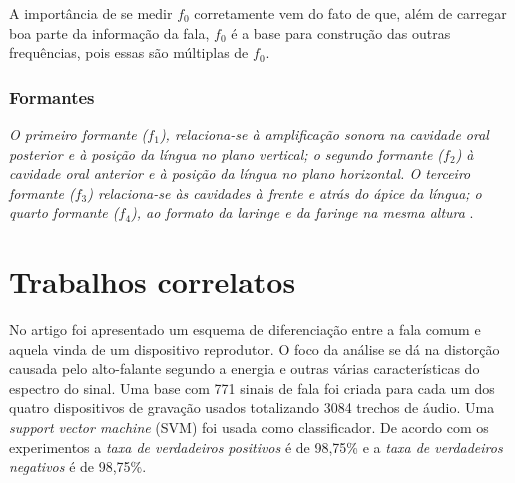 \documentclass[a4paper,12pt,openright,oneside]{book}
\newenvironment{myenv}[1]
  {\begin{spacing}{#1}}
  {\end{spacing}}
\begin{document}
\begin{myenv}{1.5}
						\par A importância de se medir $f_0$ corretamente vem do fato de que, além de carregar boa parte da informação da fala, $f_0$ é a base para construção das outras frequências, pois essas são múltiplas de $f_0$.
						
						\subsubsection{Formantes}
						
						\par \textit{O primeiro formante ($f_1$), relaciona-se à  amplificação  sonora  na  cavidade  oral  posterior  e  à  posição  da  língua  no  plano  vertical;  o segundo  formante  ($f_2$)  à  cavidade  oral  anterior  e  à  posição  da  língua  no  plano  horizontal.  O terceiro  formante  ($f_3$)  relaciona-se  às  cavidades  à  frente  e  atrás  do  ápice  da  língua;  o  quarto formante  ($f_4$),  ao  formato  da  laringe  e  da  faringe  na  mesma  altura} \cite{valencca2014analise}.


		\section{Trabalhos correlatos}
			\par No artigo \cite{Ren2019} foi apresentado um esquema de diferenciação entre a fala comum e aquela vinda de um dispositivo reprodutor. O foco da análise se dá na distorção causada pelo alto-falante segundo a energia e outras várias características do espectro do sinal. Uma base com 771 sinais de fala foi criada para cada um dos quatro dispositivos de gravação usados totalizando 3084 trechos de á\textsl{}udio. Uma \textit{support vector machine} (SVM) foi usada como classificador. De  acordo com os experimentos a \textit{taxa de verdadeiros positivos} é de 98,75\% e a \textit{taxa de verdadeiros negativos} é de 98,75\%.
			

\end{myenv}
\end{document}
